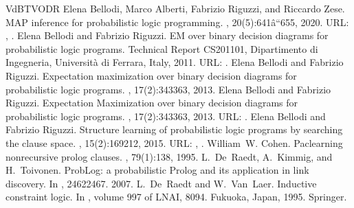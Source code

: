 \documentclass[letterpaper,10pt,english]{sphinxmanual}
\begin{document}
\begin{sphinxthebibliography}{VdBTVODR}
\sphinxAtStartPar
Elena Bellodi, Marco Alberti, Fabrizio Riguzzi, and Riccardo Zese. MAP inference for probabilistic logic programming. , 20(5):641â\texteuro{}“655, 2020. URL: , .
\sphinxAtStartPar
Elena Bellodi and Fabrizio Riguzzi. EM over binary decision diagrams for probabilistic logic programs. Technical Report CS\sphinxhyphen{}2011\sphinxhyphen{}01, Dipartimento di Ingegneria, Università di Ferrara, Italy, 2011. URL: .
\sphinxAtStartPar
Elena Bellodi and Fabrizio Riguzzi. Expectation maximization over binary decision diagrams for probabilistic logic programs. , 17(2):343\textendash{}363, 2013.
\sphinxAtStartPar
Elena Bellodi and Fabrizio Riguzzi. Expectation Maximization over binary decision diagrams for probabilistic logic programs. , 17(2):343\textendash{}363, 2013. URL: .
\sphinxAtStartPar
Elena Bellodi and Fabrizio Riguzzi. Structure learning of probabilistic logic programs by searching the clause space. , 15(2):169\textendash{}212, 2015. URL: , .
\sphinxAtStartPar
William W. Cohen. Pac\sphinxhyphen{}learning non\sphinxhyphen{}recursive prolog clauses. , 79(1):1\textendash{}38, 1995.
\sphinxAtStartPar
L. De Raedt, A. Kimmig, and H. Toivonen. ProbLog: a probabilistic Prolog and its application in link discovery. In , 2462\textendash{}2467. 2007.
\sphinxAtStartPar
L. De Raedt and W. Van Laer. Inductive constraint logic. In , volume 997 of LNAI, 80\textendash{}94. Fukuoka, Japan, 1995. Springer.
\sphinxAtStartPar

\end{sphinxthebibliography}
\end{document}
